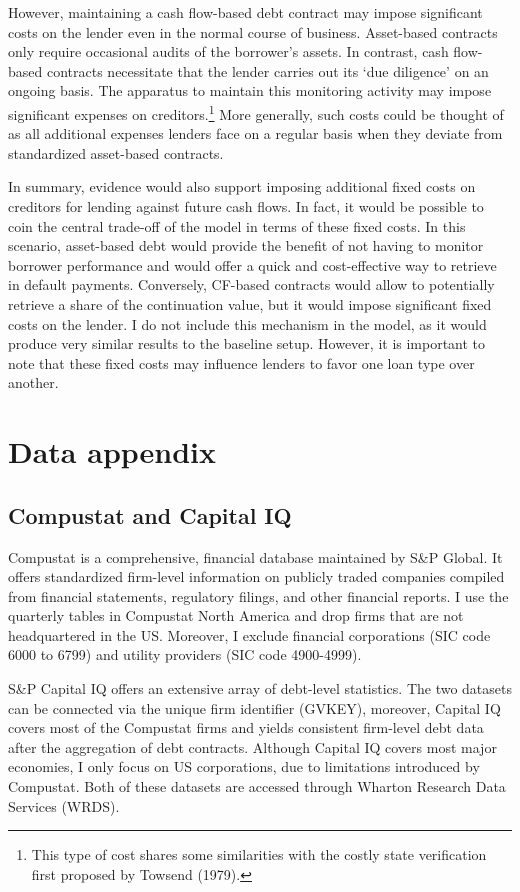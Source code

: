 \documentclass[12pt]{article}
\begin{document}
However, maintaining a cash flow-based debt contract may impose significant costs on the lender even in the normal course of business. Asset-based contracts only require occasional audits of the borrower's assets. In contrast, cash flow-based contracts necessitate that the lender carries out its `due diligence' on an ongoing basis. The apparatus to maintain this monitoring activity may impose significant expenses on creditors.\footnote{This type of cost shares some similarities with the costly state verification first proposed by Towsend (1979).} More generally, such costs could be thought of as all additional expenses lenders face on a regular basis when they deviate from standardized asset-based contracts.


In summary, evidence would also support imposing additional fixed costs on creditors for lending against future cash flows. In fact, it would be possible to coin the central trade-off of the model in terms of these fixed costs. In this scenario, asset-based debt would provide the benefit of not having to monitor borrower performance and would offer a quick and cost-effective way to retrieve in default payments. Conversely, CF-based contracts would allow to potentially retrieve a share of the continuation value, but it would impose significant fixed costs on the lender. I do not include this mechanism in the model, as it would produce very similar results to the baseline setup. However, it is important to note that these fixed costs may influence lenders to favor one loan type over another.


\section{Data appendix \label{sec:A3}}
\subsection{Compustat and Capital IQ}
Compustat is a comprehensive, financial database maintained by S\&P Global. It offers standardized firm-level information on publicly traded companies compiled from financial statements, regulatory filings, and other financial reports. I use the quarterly tables in Compustat North America and drop firms that are not headquartered in the US. Moreover, I exclude financial corporations (SIC code 6000 to 6799) and utility providers (SIC code 4900-4999). 

S\&P Capital IQ offers an extensive array of debt-level statistics. The two datasets can be connected via the unique firm identifier (GVKEY), moreover, Capital IQ covers most of the Compustat firms and yields consistent firm-level debt data after the aggregation of debt contracts. Although Capital IQ covers most major economies, I only focus on US corporations, due to limitations introduced by Compustat. Both of these datasets are accessed through Wharton Research Data Services (WRDS). 
\end{document}
